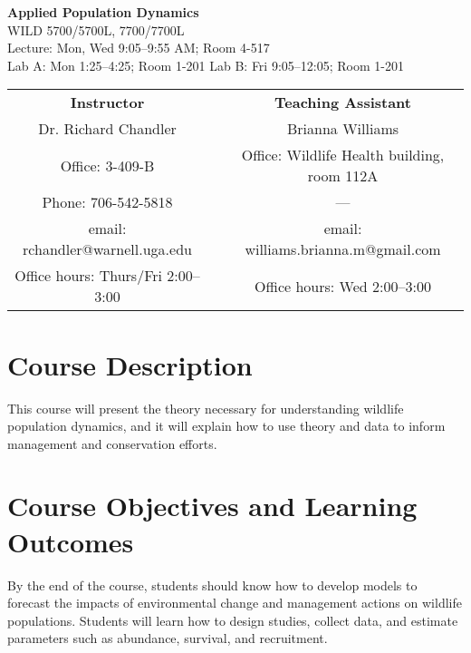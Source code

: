 \documentclass[11pt]{article}
\begin{document}
\begin{center}

{%
  \huge \bf \sc
  Applied Population Dynamics \\}
{\large
  WILD 5700/5700L, 7700/7700L  \\
  Lecture: Mon, Wed 9:05--9:55 AM; Room 4-517 \\
  Lab A: Mon 1:25--4:25; Room 1-201
  Lab B: Fri 9:05--12:05; Room 1-201
}

\large

\vspace{0.5cm}

\begin{tabular}[h!]{ccc}
\textbf{Instructor}                 & \hspace{1.5cm} & \textbf{Teaching Assistant} \\
Dr. Richard Chandler                & & Brianna Williams \\
Office: 3-409-B                     & & Office: Wildlife Health building, room 112A  \\
Phone: 706-542-5818                 & & --- \\
email: rchandler@warnell.uga.edu    & & email: williams.brianna.m@gmail.com \\
Office hours: Thurs/Fri 2:00--3:00  & & Office hours: Wed 2:00--3:00 \\
\end{tabular}
\end{center}


\normalsize


\vspace{-3mm}
\section*{Course Description}
\vspace{-5mm}
This course will present the theory necessary for understanding
wildlife population dynamics, and it will explain how to use theory
and data to inform management and conservation efforts.

\vspace{-5mm}
\section*{Course Objectives and Learning Outcomes}
\vspace{-5mm}
By the end of the course, students should know how to develop models
to forecast the impacts of environmental change and management actions
on wildlife populations. Students will learn how to design studies,
collect data, and estimate parameters such as abundance,
survival, and recruitment.
\end{document}

